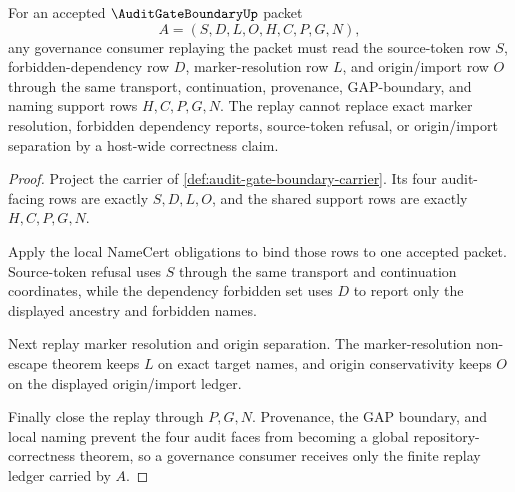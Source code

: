 \begin{theorem}
\label{thm:audit-gate-boundary-replay-ledger}
For an accepted $\AuditGateBoundaryUp$ packet
$$
A=(S,D,L,O,H,C,P,G,N),
$$
any governance consumer replaying the packet must read the source-token row $S$, forbidden-dependency row $D$, marker-resolution row $L$, and origin/import row $O$ through the same transport, continuation, provenance, GAP-boundary, and naming support rows $H,C,P,G,N$. The replay cannot replace exact marker resolution, forbidden dependency reports, source-token refusal, or origin/import separation by a host-wide correctness claim.
\end{theorem}
\begin{proof}
Project the carrier of \autoref{def:audit-gate-boundary-carrier}. Its four audit-facing rows are exactly $S,D,L,O$, and the shared support rows are exactly $H,C,P,G,N$.

Apply the local NameCert obligations to bind those rows to one accepted packet. Source-token refusal uses $S$ through the same transport and continuation coordinates, while the dependency forbidden set uses $D$ to report only the displayed ancestry and forbidden names.

Next replay marker resolution and origin separation. The marker-resolution non-escape theorem keeps $L$ on exact target names, and origin conservativity keeps $O$ on the displayed origin/import ledger.

Finally close the replay through $P,G,N$. Provenance, the GAP boundary, and local naming prevent the four audit faces from becoming a global repository-correctness theorem, so a governance consumer receives only the finite replay ledger carried by $A$.
\end{proof}

